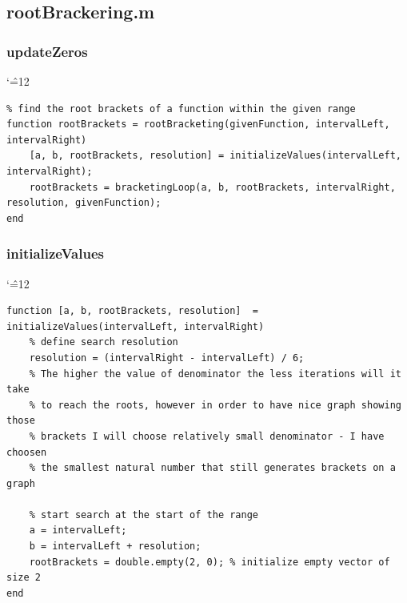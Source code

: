 \documentclass[12pt]{report}
\newenvironment{simplechar}{%
   \catcode`\^=12
}{}
\begin{document}
\subsection{rootBrackering.m}

\subsubsection{updateZeros}
\begin{simplechar}
\begin{lstlisting}
% find the root brackets of a function within the given range
function rootBrackets = rootBracketing(givenFunction, intervalLeft, intervalRight)
    [a, b, rootBrackets, resolution] = initializeValues(intervalLeft, intervalRight);
    rootBrackets = bracketingLoop(a, b, rootBrackets, intervalRight, resolution, givenFunction);
end
\end{lstlisting}
\end{simplechar}

\newpage
\subsubsection{initializeValues}
\begin{simplechar}
\begin{lstlisting}
function [a, b, rootBrackets, resolution]  = initializeValues(intervalLeft, intervalRight)
    % define search resolution
    resolution = (intervalRight - intervalLeft) / 6;
    % The higher the value of denominator the less iterations will it take
    % to reach the roots, however in order to have nice graph showing those
    % brackets I will choose relatively small denominator - I have choosen
    % the smallest natural number that still generates brackets on a graph

    % start search at the start of the range
    a = intervalLeft;
    b = intervalLeft + resolution;
    rootBrackets = double.empty(2, 0); % initialize empty vector of size 2
end
\end{lstlisting}
\end{simplechar}

\newpage
\end{document}
